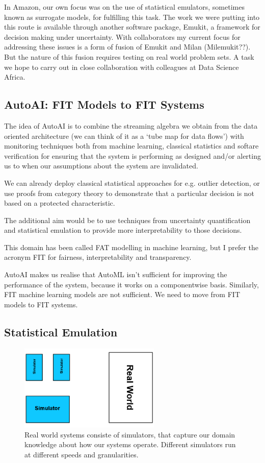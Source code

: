 \documentclass[a4paper]{caesar_book}
\begin{document}
In Amazon, our own focus was on the use of statistical emulators, sometimes known as surrogate models, for fulfilling this task. The work we were putting into this route is available through another software package, Emukit, a framework for decision making under uncertainty. With collaborators my current focus for addressing these issues is a form of fusion of Emukit and Milan (Milemukit??). But the nature of this fusion requires testing on real world problem sets. A task we hope to carry out in close collaboration with colleagues at Data Science Africa.

\subsection{AutoAI: FIT Models to FIT Systems}

The idea of AutoAI is to combine the streaming algebra we obtain from the data oriented architecture (we can think of it as a ‘tube map for data flows’) with monitoring techniques both from machine learning, classical statistics and softare verification for ensuring that the system is performing as designed and/or alerting us to when our assumptions about the system are invalidated.

We can already deploy classical statistical approaches for e.g. outlier detection, or use proofs from category theory to demonstrate that a particular decision is not based on a protected characteristic.

The additional aim would be to use techniques from uncertainty quantification and statistical emulation to provide more interpretability to those decisions.

This domain has been called FAT modelling in machine learning, but I prefer the acronym FIT for fairness, interpretability and transparency.

AutoAI makes us realise that AutoML isn’t sufficient for improving the performance of the system, because it works on a componentwise basis. Similarly, FIT machine learning models are not sufficient. We need to move from FIT models to FIT systems.

\subsection{Statistical Emulation}

\begin{figure}%
	\includegraphics[width=0.6\textwidth,keepaspectratio]{pictures/sim_1.PNG}%
	\caption*{Real world systems consiste of simulators, that capture our domain knowledge about how our systems operate. Different simulators run at different speeds and granularities.}%
\end{figure}%
\end{document}
